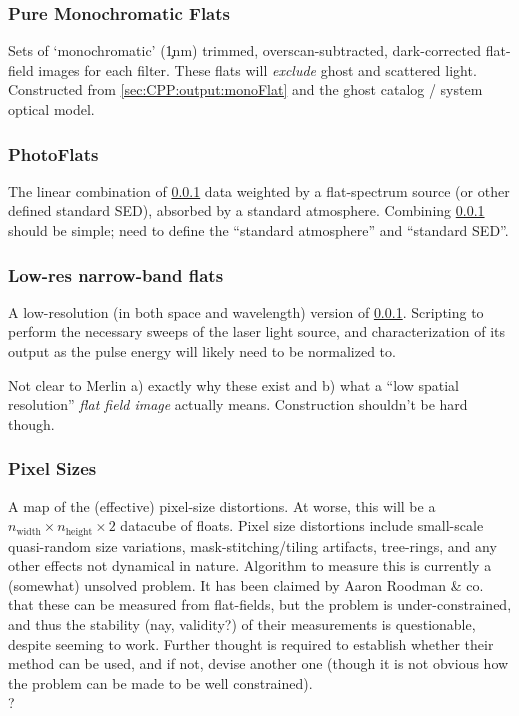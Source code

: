 \subsubsection{Pure Monochromatic Flats}\label{sec:CPP:output:monoPhotoFlat}
Sets of `monochromatic' (\c 1nm) trimmed, overscan-subtracted, dark-corrected flat-field images for each filter. These flats will \emph{exclude} ghost and scattered light.
\alg Constructed from \secsymbol\ref{sec:CPP:output:monoFlat} and the ghost catalog / system optical model.


\subsubsection{PhotoFlats}\label{sec:CPP:output:standardPhotoFlat}
The linear combination of \secsymbol\ref{sec:CPP:output:monoPhotoFlat} data weighted by a flat-spectrum source (or other defined standard SED), absorbed by a standard atmosphere.
\alg Combining \secsymbol\ref{sec:CPP:output:monoPhotoFlat} should be simple; need to define the ``standard atmosphere'' and ``standard SED''.


\subsubsection{Low-res narrow-band flats}\label{sec:CPP:output:monoPhotoFlatLowRes}
A low-resolution (in both space and wavelength) version of \secsymbol\ref{sec:CPP:output:monoPhotoFlat}.
\alg Scripting to perform the necessary sweeps of the laser light source, and characterization of its output as the pulse energy will likely need to be normalized to.	
\begin{note}
	{Not clear to Merlin a) exactly why these exist and b) what a ``low spatial resolution'' \emph{flat field image} actually means. Construction shouldn't be hard though.}
\end{note}


\subsubsection{Pixel Sizes}\label{sec:CPP:output:pixelSizeMap} 
A map of the (effective) pixel-size distortions. At worse, this will be a $n_{\mbox{width}}\times n_{\mbox{height}}\times 2$ datacube of floats. Pixel size distortions include small-scale quasi-random size variations, mask-stitching/tiling artifacts, tree-rings, and any other effects not dynamical in nature.
\alg Algorithm to measure this is currently a (somewhat) unsolved problem. It has been claimed by Aaron Roodman \& co. that these can be measured from flat-fields, but the problem is under-constrained, and thus the stability (nay, validity?) of their measurements is questionable, despite seeming to work. Further thought is required to establish whether their method can be used, and if not, devise another one (though it is not obvious how the problem can be made to be well constrained). 
\\ \dragons ?



